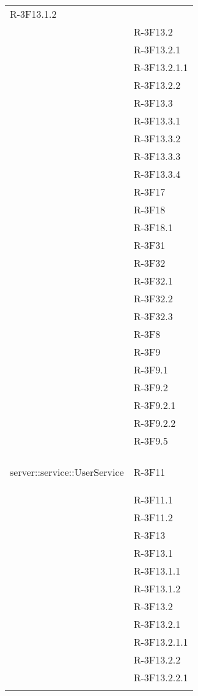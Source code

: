 \begin{longtable}{l p{3cm}}
	R-3F13.1.2 \tabularnewline &
	
	R-3F13.2 \tabularnewline &
	
	R-3F13.2.1 \tabularnewline &
	
	R-3F13.2.1.1 \tabularnewline &
	
	R-3F13.2.2 \tabularnewline &
	
	R-3F13.3 \tabularnewline &
	
	R-3F13.3.1 \tabularnewline &
	
	R-3F13.3.2 \tabularnewline &
	
	R-3F13.3.3 \tabularnewline &
	
	R-3F13.3.4 \tabularnewline &
	
	R-3F17 \tabularnewline &
	
	R-3F18 \tabularnewline &
	
	R-3F18.1 \tabularnewline &
	
	R-3F31 \tabularnewline &
	
	R-3F32 \tabularnewline &
	
	R-3F32.1 \tabularnewline &
	
	R-3F32.2 \tabularnewline &
	
	R-3F32.3 \tabularnewline &
	
	R-3F8 \tabularnewline &
	
	R-3F9 \tabularnewline &
	
	R-3F9.1 \tabularnewline &
	
	R-3F9.2 \tabularnewline &
	
	R-3F9.2.1 \tabularnewline &
	
	R-3F9.2.2 \tabularnewline &
	
	R-3F9.5 \tabularnewline &\tabularnewline
	\hline
	\hypertarget{server::service::UserService}{server::service::UserService} & R-3F11 \tabularnewline &
	
	R-3F11.1 \tabularnewline &
	
	R-3F11.2 \tabularnewline &
	
	R-3F13 \tabularnewline &
	
	R-3F13.1 \tabularnewline &
	
	R-3F13.1.1 \tabularnewline &
	
	R-3F13.1.2 \tabularnewline &
	
	R-3F13.2 \tabularnewline &
	
	R-3F13.2.1 \tabularnewline &
	
	R-3F13.2.1.1 \tabularnewline &
	
	R-3F13.2.2 \tabularnewline &
	
	R-3F13.2.2.1 \tabularnewline &
	

\end{longtable}
